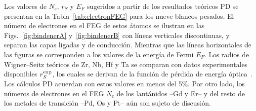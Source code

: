 Los valores de $N_e$, $r_S$ y $E_F$ sugeridos a partir de los resultados 
teóricos PD se presentan en la Tabla~\ref{tab:electronFEG} para los 
nueve blancos pesados. El número de electrones en el FEG de estos átomos 
se ilustran en las Figs.~\ref{fig:bindenerA} y~\ref{fig:bindenerB} con 
líneas verticales discontinuas, y separan las capas ligadas y de 
conducción. Mientras que las líneas horizontales de las figuras se 
corresponden a los valores de la energía de Fermi $E_F$. Los radios de 
Wigner--Seitz teóricos de Zr, Nb, Hf y Ta se comparan con datos 
experimentales disponibles $r_S^{\mbox{\scriptsize exp}}$, los cuales se 
derivan de la función de pérdida de energía 
óptica~\cite{Werner:09,Lynch:75,Isaacson:75,Romaniello:06}.
Los cálculos PD acuerdan con estos valores en menos del 5\%. Por otro 
lado, los números de electrones en el FEG $N_e$ de los lantánidos --Gd y 
Er-- y del resto de los metales de transición --Pd, Os y Pt-- aún son 
sujeto de discusión. 


\begin{comment}
Mis cálculos:
Zr  rs=2.11  EF=0.413
Nb  rs=1.80  EF=0.569
Pd  rs=1.33  EF=1.033
Gd  rs=1.75  EF=0.602
Er  rs=1.52  EF=0.793
Hf  rs=2.08  EF=0.425
Ta  rs=1.80  EF=0.569
Os  rs=1.41  EF=0.921
Pt  rs=1.35  EF=1.015

Data from Strange et al

Gd teo 3.7063 1.8531
Er teo 3.6888 1.8444

Gd exp 3.7605 1.8802
Er exp 3.6713 1.8357

\end{comment}

